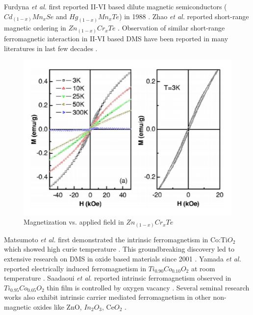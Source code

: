 \documentclass[main.tex]{subfiles}
\begin{document}
Furdyna \textit{et al.} first reported II-VI based dilute magnetic semiconductors ($Cd_{(1-x)}Mn_{x}Se$ and $Hg_{(1-x)}Mn_{x}Te$) in 1988 \cite{furdyna1988diluted}. Zhao \textit{et al.} reported short-range magnetic ordering in $Zn_{(1-x)}Cr_{x}Te$ \cite{zhao2006chemical}. Observation of similar short-range ferromagnetic interaction in II-VI based DMS have been reported in many literatures in last few decades \cite{haury1997observation, yang2010origin, dietl2010ten}. 

\begin{figure}[!htb]
	\centering
	\includegraphics[width=0.8\linewidth]{zhao}
	\caption{Magnetization vs. applied field in $Zn_{(1-x)}Cr_{x}Te$ \cite{zhao2006chemical}}
	\label{fig:TEM_PT}
\end{figure}
\FloatBarrier

Matsumoto \textit{et al.} first demonstrated the intrinsic ferromagnetism in Co:Ti$O_2$ which showed high curie temperature \cite{matsumoto2001room}. This groundbreaking discovery led to extensive research on DMS in oxide based materials since 2001 \cite{coey2005donor, philip2006carrier, coey2005high, dietl2008origin, coey2008oxide}. Yamada \textit{et al.} reported electrically induced ferromagnetism in $Ti_{0.90}Co_{0.10}O_{2}$ at room temperature \cite{yamada2011electrically}. Saadaoui \textit{et al.} reported intrinsic ferromagnetism observed in $Ti_{0.95}Co_{0.05}O_{2}$ thin film is controlled by oxygen vacancy \cite{saadaoui2016intrinsic}. Several seminal research works also exhibit intrinsic carrier mediated ferromagnetism in other non-magnetic oxides like ZnO, $In_{2}O_{3}$, Ce$O_2$ \cite{yi2010ferromagnetism, sun2008evidence, krishna2015structural, pellicer2013mesoporous, farvid2013influence, gao2007ferromagnetic, thurber2007ferromagnetism, paidi2019role}.
\end{document}
